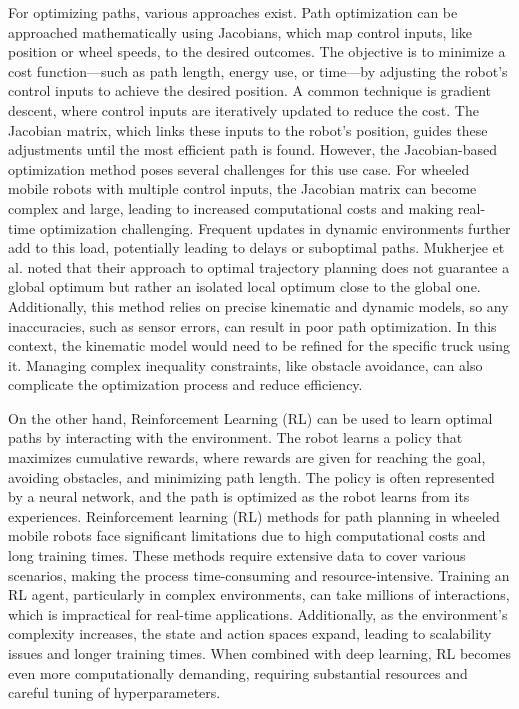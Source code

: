 For optimizing paths, various approaches exist.
Path optimization can be approached mathematically using Jacobians, which map control inputs, like position or wheel 
speeds, to the desired outcomes. The objective is to minimize a cost function—such as path length, energy use, 
or time—by adjusting the robot's control inputs to achieve the desired position. A common technique is gradient descent, 
where control inputs are iteratively updated to reduce the cost. The Jacobian matrix, which links these 
inputs to the robot's position, guides these adjustments until the most efficient path is found. However, the Jacobian-based 
optimization method poses several challenges for this use case. For wheeled mobile robots with multiple control inputs, 
the Jacobian matrix can become complex and large, leading to increased computational costs and making real-time 
optimization challenging. 
Frequent updates in dynamic environments further add to this load, potentially leading to delays or suboptimal paths. 
Mukherjee et al. \cite{R44} noted that their approach to optimal trajectory planning does not guarantee a global 
optimum but rather an isolated local optimum close to the global one. Additionally, this method relies on precise 
kinematic and dynamic models, so any inaccuracies, such as sensor errors, can result in poor path optimization. 
In this context, the kinematic model would need to be refined for the specific truck using it. Managing complex inequality 
constraints, like obstacle avoidance, can also complicate the optimization process and reduce efficiency.

On the other hand, Reinforcement Learning (RL) can be used to learn optimal paths by interacting with the environment. 
The robot learns a policy that maximizes cumulative rewards, where rewards are given for reaching the goal, avoiding 
obstacles, and minimizing path length. The policy is often represented by a neural network, and the path is optimized 
as the robot learns from its experiences. Reinforcement learning (RL) methods for path planning in wheeled mobile robots 
face significant limitations due to high computational costs and long training times. These methods require extensive 
data to cover various scenarios, making the process time-consuming and resource-intensive. Training an RL agent, 
particularly in complex environments, can take millions of interactions, which is impractical for real-time applications. 
Additionally, as the environment's complexity increases, the state and action spaces expand, 
leading to scalability issues and longer training times. When combined with deep learning, RL becomes even more 
computationally demanding, requiring substantial resources and careful tuning of hyperparameters.

